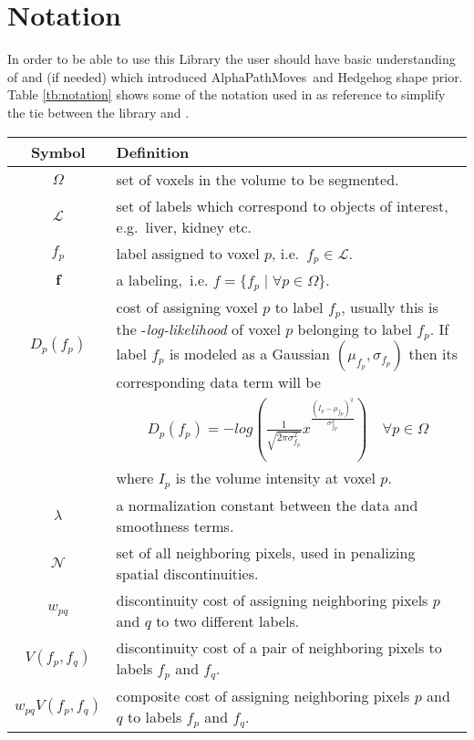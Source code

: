 \documentclass[12pt,letterpaper]{article}
\def\APM{{\ttfamily AlphaPathMoves}~}
\def\labelvars{\mathbf{f}}
\def\labelvar{f}
\def\pixelset{\Omega}
\def\neighbset{\mathcal{N}}
\def\labelset{\mathcal{L}}
\def\unary{D}
\begin{document}
\section{Notation}
In order to be able to use this Library the user should have basic understanding of \cite{pathmovesIsack} and \cite{hedgehogIsack} (if needed) which introduced \APM and Hedgehog shape prior.
Table \ref{tb:notation} shows some of the notation used in \cite{pathmovesIsack} as reference to simplify the tie between the library and \cite{pathmovesIsack}.
\newpage
\renewcommand{\arraystretch}{1.7}
\begin{table}[h]
\centering
\begin{tabular}{|c|p{14.5cm}|}
\hline
Symbol& Definition \\
\hline
$\pixelset$ & set of voxels in the volume to be segmented.\\
$\labelset$ & set of labels which correspond to objects of interest, e.g.~liver, kidney etc.\\
$\labelvar_p$ & label assigned to voxel $p$, i.e.~$\labelvar_p \in \labelset$.\\
$\labelvars$ & a labeling,~i.e. $\labelvar= \{\labelvar_p \; | \; \forall p \in \pixelset\}$.\\
$\unary_p(\labelvar_p)$ & cost of assigning voxel $p$ to label $\labelvar_p$, usually this is the -{\em log-likelihood} of voxel $p$ belonging to label $\labelvar_p$. If label $\labelvar_p$ is modeled as a Gaussian $(\mu_{\labelvar_p},\sigma_{\labelvar_p})$ then its corresponding data term will be \\
 &
 \multicolumn{1}{|c|}{
 \(
 \displaystyle \unary_p(\labelvar_p)= -log
 \left(
 \frac{1}{\sqrt{2\pi\sigma_{\labelvar_p}^2}} x^{\frac{(I_p-\mu_{\labelvar_p})^2}{\sigma_{\labelvar_p}^2}}
 \right) \quad \forall p \in \pixelset
 \)
 } \\
 & where $I_p$ is the volume intensity at voxel $p$.\\
 $\lambda$ & a normalization constant between the data and smoothness terms. \\
$\neighbset$ & set of all neighboring pixels, used in penalizing spatial discontinuities. \\
$w_{pq}$ & discontinuity cost of assigning neighboring pixels $p$ and $q$ to two different labels. \\
$V(\labelvar_p,\labelvar_q)$ & discontinuity cost of a pair of neighboring pixels to labels $\labelvar_p$ and $\labelvar_q$.\\
$w_{pq}V(\labelvar_p,\labelvar_q)$ & composite cost of assigning neighboring pixels $p$ and $q$ to labels $\labelvar_p$ and $\labelvar_q$. \\

\end{tabular}
\end{table}
\end{document}

